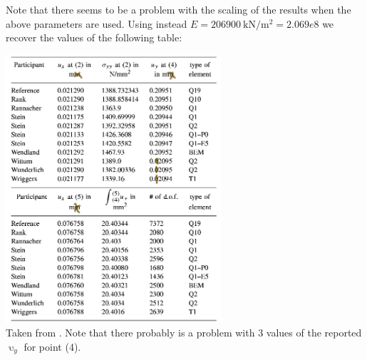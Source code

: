 Note that there seems to be a problem with the scaling of the results when the above 
parameters are used. Using instead $E=\SI{206 900}{\kilo\newton\per\square\meter}=2.069e8$
we recover the values of the following table: 
\begin{center}
\includegraphics[width=8cm]{python_codes/fieldstone_124/images/rarr03b}\\
{\captionfont Taken from \textcite{rarr03}. Note that there probably is a 
problem with 3 values of the reported $\upupsilon_y$ for point (4).}
\end{center}


